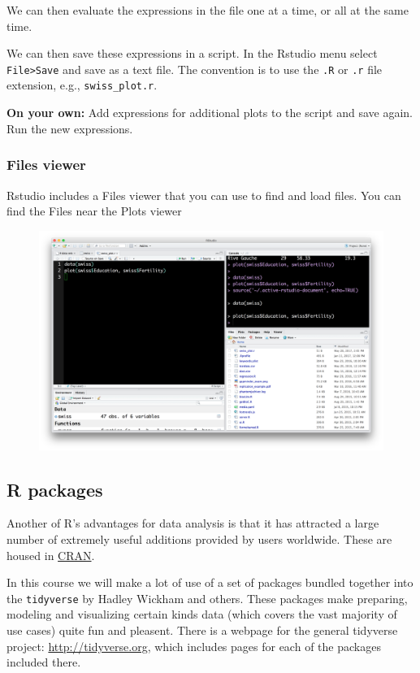 \documentclass[]{article}
\theoremstyle{definition}
\theoremstyle{definition}
\theoremstyle{remark}
\begin{document}
We can then evaluate the expressions in the file one at a time, or all
at the same time.

We can then save these expressions in a script. In the Rstudio menu
select \texttt{File\textgreater{}Save} and save as a text file. The
convention is to use the \texttt{.R} or \texttt{.r} file extension,
e.g., \texttt{swiss\_plot.r}.

\textbf{On your own:} Add expressions for additional plots to the script
and save again. Run the new expressions.

\subsubsection{Files viewer}\label{files-viewer}

Rstudio includes a Files viewer that you can use to find and load files.
You can find the Files near the Plots viewer

\begin{figure}[htbp]
\centering
\includegraphics{img/rstudio_files.png}
\caption{}
\end{figure}

\subsection{R packages}\label{r-packages}

Another of R's advantages for data analysis is that it has attracted a
large number of extremely useful additions provided by users worldwide.
These are housed in
\href{https://cran.r-project.org/web/packages/index.html}{CRAN}.

In this course we will make a lot of use of a set of packages bundled
together into the \texttt{tidyverse} by Hadley Wickham and others. These
packages make preparing, modeling and visualizing certain kinds data
(which covers the vast majority of use cases) quite fun and pleasent.
There is a webpage for the general tidyverse project:
\url{http://tidyverse.org}, which includes pages for each of the
packages included there.
\end{document}
